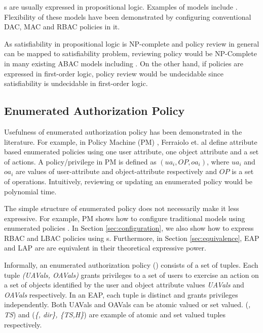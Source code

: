 	\LAP{}s are usually expressed in propositional logic. Examples of  \LPModels{} models  include \cite{abacAlpha,hgabac,abac-ws,abac-for-web-service}.  Flexibility of these models have been demonstrated by configuring conventional DAC\cite{dac}, MAC\cite{lbac} and RBAC \cite{rbac} policies in it. 
	
	
	As satisfiability in propositional logic is NP-complete and policy review in general can be mapped to satisfiability problem, reviewing policy would be NP-Complete in many existing ABAC models including \cite{abacAlpha,hgabac,abac-for-web-service}. On the other hand, if policies are expressed in first-order logic, policy review would be undecidable since  satisfiability is undecidable in first-order logic.
	
\subsection{Enumerated Authorization Policy}
	Usefulness of enumerated authorization policy has been demonstrated in the literature. For example, in Policy Machine (PM) \cite{policy-machine}, Ferraiolo et. al define attribute based enumerated policies using one user attribute, one object attribute and a set of actions. A policy/privilege in PM is defined as $(ua_i, OP, oa_i)$, where $ua_i$ and $oa_i$ are values of user-attribute and object-attribute respectively and $OP$ is  a set of operations. Intuitively, reviewing or updating an enumerated policy would be polynomial time.
		
	The simple structure of enumerated policy does not necessarily make it less expressive. For example, PM shows how to configure traditional models using enumerated policies \cite{INCITS526}. In Section \ref{sec:configuration}, we also show how to express RBAC \cite{rbac} and LBAC \cite{lbac} policies using \EAP{}s. Furthermore, in Section \ref{sec:equivalence}, EAP and LAP are are equivalent in their theoretical expressive power.
	
	Informally, an enumerated authorization policy (\EAP{}) consists of a set of  tuples.  Each tuple \textit{(UAVals, OAVals)} grants privileges to a set of users  to exercise an action on a set of objects identified by the user and object attribute values \textit{UAVals} and \textit{OAVals} respectively. In an EAP, each tuple is distinct and grants privileges independently. Both  UAVals{} and OAVals{} can be atomic valued or set valued. (\textit{\manager, TS}) and (\textit{\{\manager, dir\}, \{TS,H\}}) are example of atomic and set valued tuples respectively. 
	
